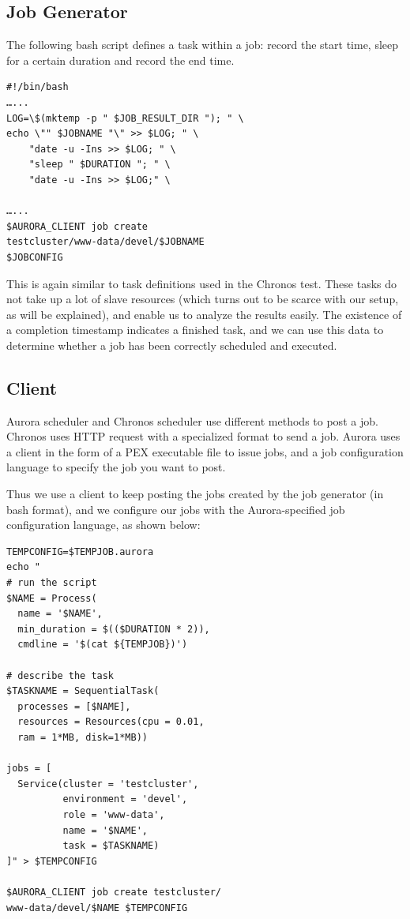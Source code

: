 \documentclass[letterpaper,twocolumn,10pt]{article}
\begin{document}
\subsection{Job Generator}
The following bash script defines a task within a job: record the start time, sleep for a certain duration and record the end time. 
\begin{verbatim}
#!/bin/bash
…...
LOG=\$(mktemp -p " $JOB_RESULT_DIR "); " \
echo \"" $JOBNAME "\" >> $LOG; " \
    "date -u -Ins >> $LOG; " \
    "sleep " $DURATION "; " \
    "date -u -Ins >> $LOG;" \

…...
$AURORA_CLIENT job create
testcluster/www-data/devel/$JOBNAME 
$JOBCONFIG

\end{verbatim}

This is again similar to task definitions used in the Chronos test. These tasks do not take up a lot of slave resources (which turns out to be scarce with our setup, as will be explained), and enable us to analyze the results easily. The existence of a completion timestamp indicates a finished task, and we can use this data to determine whether a job has been correctly scheduled and executed.

\subsection{Client}
Aurora scheduler and Chronos scheduler use different methods to post a job. Chronos uses HTTP request with a specialized format to send a job. Aurora uses a client in the form of a PEX executable file to issue jobs, and a job configuration language to specify the job you want to post.

Thus we use a client to keep posting the jobs created by the job generator (in bash format), and we configure our jobs with the Aurora-specified job configuration language, as shown below:

\begin{verbatim}
TEMPCONFIG=$TEMPJOB.aurora
echo "
# run the script
$NAME = Process(
  name = '$NAME',
  min_duration = $(($DURATION * 2)),
  cmdline = '$(cat ${TEMPJOB})')

# describe the task
$TASKNAME = SequentialTask(
  processes = [$NAME],
  resources = Resources(cpu = 0.01,
  ram = 1*MB, disk=1*MB))

jobs = [
  Service(cluster = 'testcluster',
          environment = 'devel',
          role = 'www-data',
          name = '$NAME',
          task = $TASKNAME)
]" > $TEMPCONFIG

$AURORA_CLIENT job create testcluster/
www-data/devel/$NAME $TEMPCONFIG
\end{verbatim}
\end{document}

